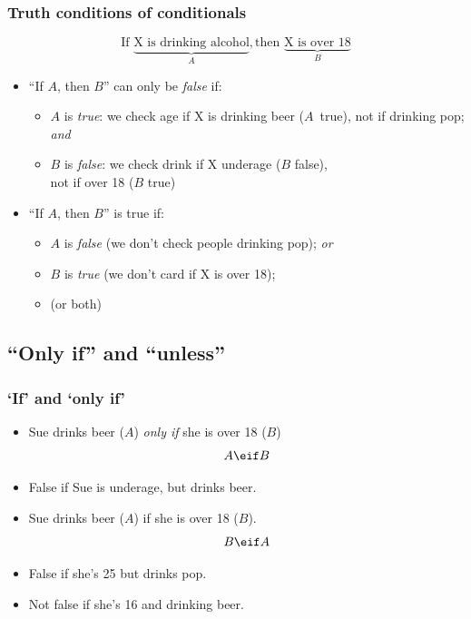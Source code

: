 
\begin{frame}
  \frametitle{Truth conditions of conditionals}

\[\text{If\ } \underbrace{\text{X is drinking alcohol}}_{A},
\text{then\ }\underbrace{\text{X is over 18}}_{B}\]

\begin{itemize}[<+->]
\item ``If $A$, then $B$'' can only be \emph{false} if:
\begin{itemize}
\item $A$ is \emph{true}: we check age if X is drinking beer ($A$~true), not if
 drinking pop; \emph{and}
\item $B$ is \emph{false}: we check drink if X underage ($B$ false),\\ not
if over 18 ($B$ true)
\end{itemize}
\item ``If $A$, then $B$'' is true if:
\begin{itemize}
\item $A$ is \emph{false} (we don't check people drinking pop); \emph{or}
\item $B$ is \emph{true} (we don't card if X is over 18);
\item (or both)
\end{itemize}
\end{itemize}
\end{frame}


\subsection{``Only if'' and ``unless''}

\begin{frame}
  \frametitle{`If' and `only if'}

\begin{itemize}[<+->]
  \item Sue drinks beer ($A$) \emph{only if} she is over 18 ($B$)
  \[
  A \eif B
  \]
  \item False if Sue is underage, but drinks beer.
  \item Sue drinks beer ($A$) if she is over 18 ($B$).
  \[
  B \eif A
  \]
  \item False if she's 25 but drinks pop.
  \item Not false if she's 16 and drinking beer.
\end{itemize}
\end{frame}

